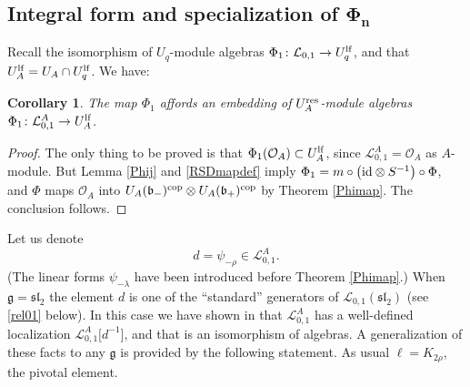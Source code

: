 \documentclass[pdftex]{sigma}
\numberwithin{equation}{section}
\newtheorem{cor}[teo]{Corollary}
\theoremstyle{definition}
\newcommand{\Ll}{{\mathcal L}}
\newcommand{\Oo}{{\mathcal O}}
\newcommand{\ra}{\rightarrow}
\begin{document}
\subsection[Integral form and specialization of Phi\_n]{Integral form and specialization of $\boldsymbol{\Phi_n}$}\label{INTPHIn}
Recall the isomorphism of $U_q$-module algebras $\Phi_1\colon \Ll_{0,1} \ra U_q^{\rm lf}$, and that $U_A^{\rm lf} = U_A\cap U_q^{\rm lf}$. We have:

\begin{cor}\label{Phi1int} The map $\Phi_1$ affords an embedding of $U_A^{\rm res}$-module algebras $\Phi_1\colon \Ll_{0,1}^A \ra U_A^{\rm lf}$.
\end{cor}
\begin{proof} The only thing to be proved is that $\Phi_1(\Oo_A) \subset U_A^{\rm lf}$, since $\Ll_{0,1}^A = \Oo_A$ as $A$-module. But Lemma \ref{Phij} and \eqref{RSDmapdef} imply $\Phi_1 = m\circ \big({\rm id}\otimes S^{-1}\big)\circ \Phi$, and $\Phi$ maps $\Oo_A$ into $U_A(\mathfrak{b}_-)^{\rm cop}\otimes U_A(\mathfrak{b}_+)^{\rm cop}$ by Theorem \ref{Phimap}. The conclusion follows.
 \end{proof}

Let us denote
\[d=\psi_{-\rho}\in \Ll_{0,1}^A.\]
(The linear forms $\psi_{-\lambda}$ have been introduced before Theorem \ref{Phimap}.) When $\mathfrak{g}={\mathfrak{sl}_2}$ the element $d$ is one of the ``standard'' generators of $\Ll_{0,1}({\mathfrak{sl}_2})$ (see \eqref{rel01} below). In this case we have shown in \cite[Lemma 5.7]{BR} that $\Ll_{0,1}^A$ has a well-defined localization $\Ll_{0,1}^A\big[d^{-1}\big]$, and that \smash{$\Phi_1\colon \Ll_{0,1}^A\big[d^{-1}\big] \ra U_A^{\rm ad}=T_{2-}^{-1}U_A^{\rm lf}$} is an isomorphism of algebras. A generalization of these facts to any $\mathfrak{g}$ is provided by the following statement. As usual $\ell=K_{2\rho}$, the pivotal element.
\end{document}
